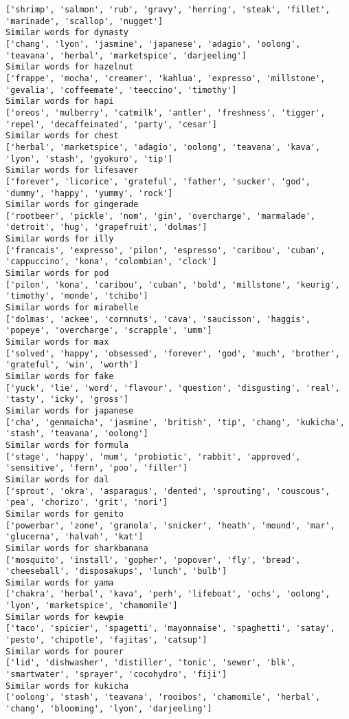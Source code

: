 \documentclass[11pt]{article}
\begin{document}
\begin{Verbatim}[commandchars=\\\{\}]
['shrimp', 'salmon', 'rub', 'gravy', 'herring', 'steak', 'fillet', 'marinade', 'scallop', 'nugget']
Similar words for dynasty
['chang', 'lyon', 'jasmine', 'japanese', 'adagio', 'oolong', 'teavana', 'herbal', 'marketspice', 'darjeeling']
Similar words for hazelnut
['frappe', 'mocha', 'creamer', 'kahlua', 'expresso', 'millstone', 'gevalia', 'coffeemate', 'teeccino', 'timothy']
Similar words for hapi
['oreos', 'mulberry', 'catmilk', 'antler', 'freshness', 'tigger', 'repel', 'decaffeinated', 'party', 'cesar']
Similar words for chest
['herbal', 'marketspice', 'adagio', 'oolong', 'teavana', 'kava', 'lyon', 'stash', 'gyokuro', 'tip']
Similar words for lifesaver
['forever', 'licorice', 'grateful', 'father', 'sucker', 'god', 'dummy', 'happy', 'yummy', 'rock']
Similar words for gingerade
['rootbeer', 'pickle', 'nom', 'gin', 'overcharge', 'marmalade', 'detroit', 'hug', 'grapefruit', 'dolmas']
Similar words for illy
['francais', 'expresso', 'pilon', 'espresso', 'caribou', 'cuban', 'cappuccino', 'kona', 'colombian', 'clock']
Similar words for pod
['pilon', 'kona', 'caribou', 'cuban', 'bold', 'millstone', 'keurig', 'timothy', 'monde', 'tchibo']
Similar words for mirabelle
['dolmas', 'ackee', 'cornnuts', 'cava', 'saucisson', 'haggis', 'popeye', 'overcharge', 'scrapple', 'umm']
Similar words for max
['solved', 'happy', 'obsessed', 'forever', 'god', 'much', 'brother', 'grateful', 'win', 'worth']
Similar words for fake
['yuck', 'lie', 'word', 'flavour', 'question', 'disgusting', 'real', 'tasty', 'icky', 'gross']
Similar words for japanese
['cha', 'genmaicha', 'jasmine', 'british', 'tip', 'chang', 'kukicha', 'stash', 'teavana', 'oolong']
Similar words for formula
['stage', 'happy', 'mum', 'probiotic', 'rabbit', 'approved', 'sensitive', 'fern', 'poo', 'filler']
Similar words for dal
['sprout', 'okra', 'asparagus', 'dented', 'sprouting', 'couscous', 'pea', 'chorizo', 'grit', 'nori']
Similar words for genito
['powerbar', 'zone', 'granola', 'snicker', 'heath', 'mound', 'mar', 'glucerna', 'halvah', 'kat']
Similar words for sharkbanana
['mosquito', 'install', 'gopher', 'popover', 'fly', 'bread', 'cheeseball', 'disposakups', 'lunch', 'bulb']
Similar words for yama
['chakra', 'herbal', 'kava', 'perh', 'lifeboat', 'ochs', 'oolong', 'lyon', 'marketspice', 'chamomile']
Similar words for kewpie
['taco', 'spicier', 'spagetti', 'mayonnaise', 'spaghetti', 'satay', 'pesto', 'chipotle', 'fajitas', 'catsup']
Similar words for pourer
['lid', 'dishwasher', 'distiller', 'tonic', 'sewer', 'blk', 'smartwater', 'sprayer', 'cocohydro', 'fiji']
Similar words for kukicha
['oolong', 'stash', 'teavana', 'rooibos', 'chamomile', 'herbal', 'chang', 'blooming', 'lyon', 'darjeeling']

\end{Verbatim}
\end{document}
